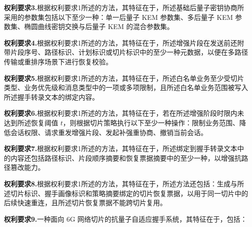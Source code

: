 \documentclass[12pt,a4paper]{article}
\begin{document}
\vspace{0.5cm}

\textbf{权利要求3.}根据权利要求1所述的方法，其特征在于，所述基础后量子密钥协商所采用的参数集包括以下至少一种：单一后量子 KEM 参数集、多后量子 KEM 参数集、椭圆曲线密钥交换与后量子 KEM 的混合参数集。

\vspace{0.5cm}

\textbf{权利要求4.}根据权利要求1所述的方法，其特征在于，所述增强片段在发送前还附带片段序号、路径标识、计划标识或切片标识中的至少一种元数据，以便在多路径传输或重排序场景下进行恢复校验。

\vspace{0.5cm}

\textbf{权利要求5.}根据权利要求1所述的方法，其特征在于，所述白名单业务至少受切片类型、业务优先级和消息类型中的一项或多项限制，且所述白名单业务范围被写入所述握手转录文本的绑定内容。

\vspace{0.5cm}

\textbf{权利要求6.}根据权利要求1所述的方法，其特征在于，若在所述增强阶段时限内未达到所述恢复阈值 $t$，则根据切片策略执行以下至少一种操作：限制业务范围、降低会话权限、请求重发增强片段、发起补强重协商、撤销当前会话。

\vspace{0.5cm}

\textbf{权利要求7.}根据权利要求1所述的方法，其特征在于，所述绑定到握手转录文本中的内容还包括路径标识、片段顺序摘要和恢复票据摘要中的至少一种，以增强抗路径篡改能力。

\vspace{0.5cm}

\textbf{权利要求8.}根据权利要求1所述的方法，其特征在于，所述方法还包括：生成与所述切片标识、握手画像标识和策略摘要绑定的切片恢复票据，以用于同一切片中的后续快速重连，且所述切片恢复票据不能跨切片复用。

\vspace{0.5cm}

\textbf{权利要求9.}一种面向 6G 网络切片的抗量子自适应握手系统，其特征在于，包括：
\end{document}
